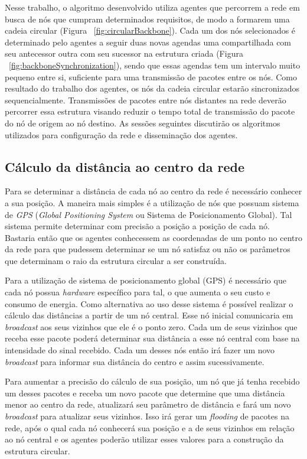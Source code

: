 Nesse trabalho, o algoritmo desenvolvido utiliza agentes que percorrem a rede em busca de nós que cumpram determinados requisitos, de modo a formarem uma cadeia circular (Figura ~\ref{fig:circularBackbone}). Cada um dos nós selecionados é determinado pelo agentes a seguir duas novas agendas uma compartilhada com seu antecessor outra com seu sucessor na estrutura criada (Figura ~\ref{fig:backboneSynchronization}), sendo que essas agendas tem um intervalo muito pequeno entre si, suficiente para uma transmissão de pacotes entre os nós. Como resultado do trabalho dos agentes, os nós da cadeia circular estarão sincronizados sequencialmente. Transmissões de pacotes entre nós distantes na rede deverão percorrer essa estrutura visando reduzir o tempo total de transmissão do pacote do nó de origem ao nó destino. As sessões seguintes discutirão os algoritmos utilizados para configuração da rede e disseminação dos agentes.

\subsection{Cálculo da distância ao centro da rede}
\label{sec:calculoDistancia}

Para se determinar a distância de cada nó ao centro da rede é necessário conhecer a sua posição. A maneira mais simples é a utilização de nós que possuam sistema de \emph{GPS} (\emph{Global Positioning System} ou Sistema de Posicionamento Global). Tal sistema permite determinar com precisão a posição a posição de cada nó. Bastaria então que os agentes conhecessem as coordenadas de um ponto no centro da rede para que pudessem determinar se um nó satisfaz ou não os parâmetros que determinam o raio da estrutura circular a ser construída.

Para a utilização de sistema de posicionamento global (GPS) é necessário que cada nó possua \emph{hardware} específico para tal, o que aumenta o seu custo e consumo de energia. Como alternativa ao uso desse sistema é possível realizar o cálculo das distâncias a partir de um nó central. Esse nó inicial comunicaria em \emph{broadcast} aos seus vizinhos que ele é o ponto zero. Cada um de seus vizinhos que receba esse pacote poderá determinar sua distância a esse nó central com base na intensidade do sinal recebido.  Cada um desses nós então irá fazer um novo \emph{broadcast} para informar sua distância do centro e assim sucessivamente. 

Para aumentar a precisão do cálculo de sua posição, um nó que já tenha recebido um desses pacotes e receba um novo pacote que determine que uma distância menor ao centro da rede, atualizará seu parâmetro de distância e fará um novo \emph{broadcast} para atualizar seus vizinhos. Isso irá gerar um \emph{flooding} de pacotes na rede, após o qual cada nó conhecerá sua posição e a de seus vizinhos em relação ao nó central e os agentes poderão utilizar esses valores para a construção da estrutura circular. 

